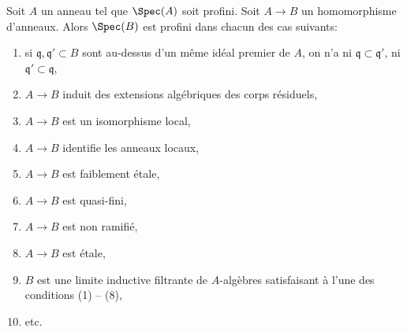 \begin{lemma}
\label{lemma-profinite-goes-up}
Soit $A$ un anneau tel que $\Spec(A)$ soit profini. Soit $A \to B$ un
homomorphisme d'anneaux. Alors $\Spec(B)$ est profini dans chacun des cas suivants:
\begin{enumerate}
\item si $\mathfrak q,\mathfrak q' \subset B$ sont au-dessus d'un m\^eme
id\'eal premier de $A$, on n'a ni $\mathfrak q \subset \mathfrak q'$, ni
$\mathfrak q' \subset \mathfrak q$,
\item $A \to B$ induit des extensions alg\'ebriques des corps r\'esiduels,
\item $A \to B$ est un isomorphisme local,
\item $A \to B$ identifie les anneaux locaux,
\item $A \to B$ est faiblement \'etale,
\item $A \to B$ est quasi-fini,
\item $A \to B$ est non ramifi\'e,
\item $A \to B$ est \'etale,
\item $B$ est une limite inductive filtrante de $A$-alg\`ebres satisfaisant \`a l'une des conditions (1) -- (8),
\item etc.
\end{enumerate}
\end{lemma}

